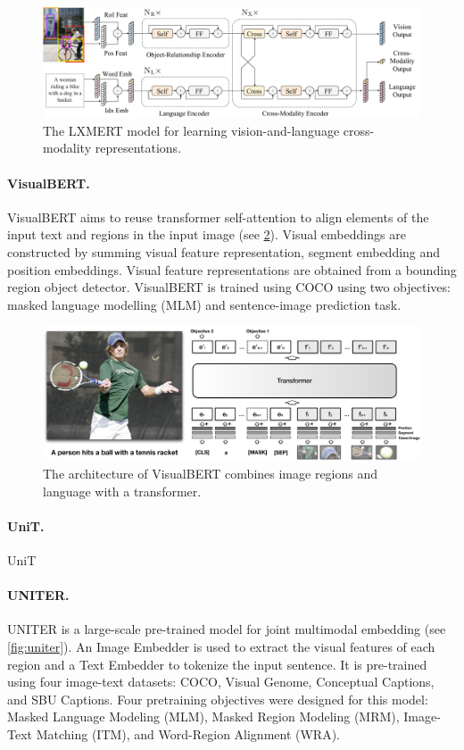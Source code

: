 \begin{figure}[ht]
    \centering
    \includegraphics[width=\linewidth]{images/models/lxmert.pdf}
    \caption{The LXMERT model for learning vision-and-language cross-modality representations.}
    \label{fig:lxmert}
\end{figure}

\paragraph{VisualBERT.} VisualBERT \cite{li2019visualbert} aims to reuse transformer self-attention to align elements of the input text and regions in the input image (see \cref{fig:visualbert}). Visual embeddings are constructed by summing visual feature representation, segment embedding and position embeddings. Visual feature representations are obtained from a bounding region object detector. VisualBERT is trained using COCO using two objectives: masked language modelling (MLM) and sentence-image prediction task.

\begin{figure}[ht]
    \centering
    \includegraphics[width=\linewidth]{images/models/visualbert.pdf}
    \caption{The architecture of VisualBERT combines image regions and language with a transformer.}
    \label{fig:visualbert}
\end{figure}

\paragraph{UniT.} UniT \cite{hu2021unit}

\paragraph{UNITER.} UNITER \cite{chen2020uniter} is a large-scale pre-trained model for joint multimodal embedding (see \cref{fig:uniter}). An Image Embedder is used to extract the visual features of each region and a Text Embedder to tokenize the input sentence. It is pre-trained using four image-text datasets: COCO, Visual Genome, Conceptual Captions, and SBU Captions. Four pretraining objectives were designed for this model: Masked Language Modeling (MLM), Masked Region Modeling (MRM), Image-Text Matching (ITM), and Word-Region Alignment (WRA).

